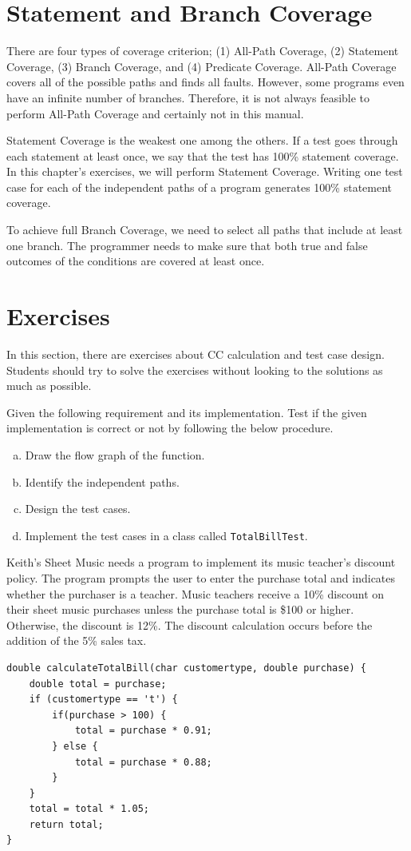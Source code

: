 \section{Statement and Branch Coverage}
There are four types of coverage criterion; (1) All-Path Coverage, (2) Statement Coverage, (3) Branch Coverage, and (4) Predicate Coverage. All-Path Coverage covers all of the possible paths and finds all faults. However, some programs even have an infinite number of branches. Therefore, it is not always feasible to perform All-Path Coverage and certainly not in this manual.

Statement Coverage is the weakest one among the others. If a test goes through each statement at least once, we say that the test has 100\% statement coverage. In this chapter's exercises, we will perform Statement Coverage. Writing one test case for each of the independent paths of a program generates 100\% statement coverage.

To achieve full Branch Coverage, we need to select all paths that include at least one branch. The programmer needs to make sure that both true and false outcomes of the conditions are covered at least once.

\section{Exercises}
In this section, there are exercises about CC calculation and test case design. Students should try to solve the exercises without looking to the solutions as much as possible.

\begin{exercise}
    Given the following requirement and its implementation. Test if the given implementation is correct or not by following the below procedure.
    \begin{enumerate}[a),noitemsep]
        \item Draw the flow graph of the function.
        \item Identify the independent paths.
        \item Design the test cases.
        \item Implement the test cases in a class called \lstinline!TotalBillTest!.
    \end{enumerate}

    Keith’s Sheet Music needs a program to implement its music teacher’s discount policy. The program prompts the user to enter the purchase total and indicates whether the purchaser is a teacher. Music teachers receive a 10\% discount on their sheet music purchases unless the purchase total is \$100 or higher. Otherwise, the discount is 12\%. The discount calculation occurs before the addition of the 5\% sales tax.
    
    \begin{lstlisting}
double calculateTotalBill(char customertype, double purchase) {
    double total = purchase;
    if (customertype == 't') {
        if(purchase > 100) {
            total = purchase * 0.91;
        } else {
            total = purchase * 0.88;
        }
    }
    total = total * 1.05;
    return total;
}
    \end{lstlisting}
\end{exercise}

